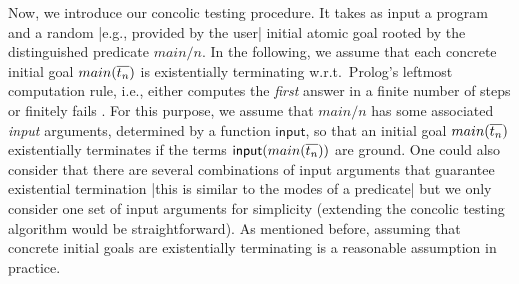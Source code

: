 \documentclass[fleqn]{tlp}
\newcommand{\inp}{\mathsf{input}}
\begin{document}
Now, we introduce our concolic testing procedure. It takes as input a
program and a random |e.g., provided by the user| initial atomic goal
rooted by the distinguished predicate $main/n$. In the following, we assume
that each concrete initial goal $main(\overline{t_n})$ is existentially
terminating w.r.t.\ Prolog's leftmost computation rule, i.e., either
computes the \emph{first} answer in a finite number of steps or
finitely fails \cite{Vasak86a}.
For this purpose, we assume that $main/n$ has some associated
\emph{input} arguments, determined by a function $\inp$, so that an
initial goal $main(\overline{t_n})$ existentially terminates if the terms
$\inp(main(\ol{t_n}))$ are ground. One could also consider that there
are several combinations of input arguments that guarantee existential
termination |this is similar to the modes of a predicate| but we only
consider one set of input arguments for simplicity (extending the
concolic testing algorithm would be straightforward).
As mentioned before, assuming that concrete initial goals are
existentially terminating is a reasonable assumption in practice.
\end{document}
